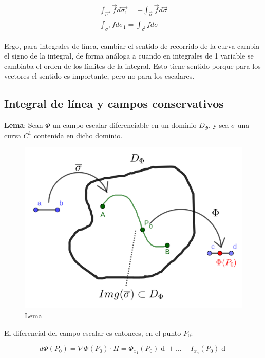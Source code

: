 \documentclass{article}
\begin{document}
\begin{gather}
\int_{\overrightarrow{\sigma_1}} \overrightarrow{f} d\overrightarrow{\sigma_1} = - \int_{\overrightarrow{\sigma}} \overrightarrow{f} d\overrightarrow{\sigma} \\
\int_{\overrightarrow{\sigma_1}} f d\sigma_1 = \int_{\overrightarrow{\sigma}} f d\sigma
\end{gather}

Ergo, para integrales de línea, cambiar el sentido de recorrido de la curva cambia el signo de la integral, de forma análoga a cuando en integrales de 1 variable se cambiaba el orden de los límites de la integral. Esto tiene sentido porque para los vectores el sentido es importante, pero no para los escalares.

\subsection{Integral de línea y campos conservativos}

\textbf{Lema}: Sean $\Phi$ un campo escalar diferenciable en un dominio $D_{\Phi}$, y sea $\sigma$ una curva $C^1$ contenida en dicho dominio. 

\begin{figure}[ht]
\centering
\caption{Lema}
\includegraphics[scale=0.75]{img/teo_fig021_cc.png}
\end{figure}

El diferencial del campo escalar es entonces, en el punto $P_0$:

\begin{equation}
d\Phi(P_0) = \nabla\Phi(P_0) \cdot H = \Phi_{x_1}(P_0) \mathop{dx_1} + \ldots + I_{x_n}(P_0) \mathop{dx_n} 
\end{equation}
\end{document}
